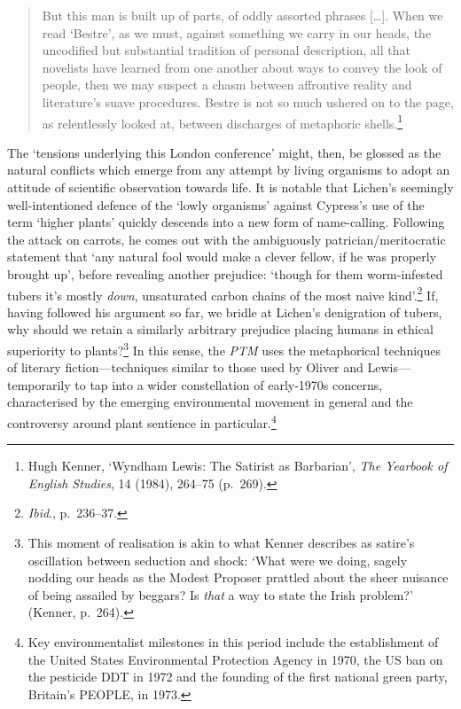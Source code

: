 \documentclass[]{article}
\begin{document}
\begin{quote}
But this man is built up of parts, of oddly assorted phrases
{[}\ldots{}{]}. When we read `Bestre', as we must, against something we
carry in our heads, the uncodified but substantial tradition of personal
description, all that novelists have learned from one another about ways
to convey the look of people, then we may suspect a chasm between
affrontive reality and literature's suave procedures. Bestre is not so
much ushered on to the page, as relentlessly looked at, between
discharges of metaphoric shells.\footnote{Hugh Kenner, `Wyndham Lewis:
  The Satirist as Barbarian', \emph{The Yearbook of English Studies}, 14
  (1984), 264--75 (p.~269).}
\end{quote}

\noindent The `tensions underlying this London conference' might, then,
be glossed as the natural conflicts which emerge from any attempt by
living organisms to adopt an attitude of scientific observation towards
life. It is notable that Lichen's seemingly well-intentioned defence of
the `lowly organisms' against Cypress's use of the term `higher plants'
quickly descends into a new form of name-calling. Following the attack
on carrots, he comes out with the ambiguously patrician/meritocratic
statement that `any natural fool would make a clever fellow, if he was
properly brought up', before revealing another prejudice: `though for
them worm-infested tubers it's mostly \emph{down}, unsaturated carbon
chains of the most naive kind'.\footnote{\emph{Ibid}., p.~236--37.} If,
having followed his argument so far, we bridle at Lichen's denigration
of tubers, why should we retain a similarly arbitrary prejudice placing
humans in ethical superiority to plants?\footnote{This moment of
  realisation is akin to what Kenner describes as satire's oscillation
  between seduction and shock: `What were we doing, sagely nodding our
  heads as the Modest Proposer prattled about the sheer nuisance of
  being assailed by beggars? Is \emph{that} a way to state the Irish
  problem?' (Kenner, p.~264).} In this sense, the \emph{PTM} uses the
metaphorical techniques of literary fiction---techniques similar to
those used by Oliver and Lewis---temporarily to tap into a wider
constellation of early-1970s concerns, characterised by the emerging
environmental movement in general and the controversy around plant
sentience in particular.\footnote{Key environmentalist milestones in
  this period include the establishment of the United States
  Environmental Protection Agency in 1970, the US ban on the pesticide
  DDT in 1972 and the founding of the first national green party,
  Britain's PEOPLE, in 1973.}
\end{document}

